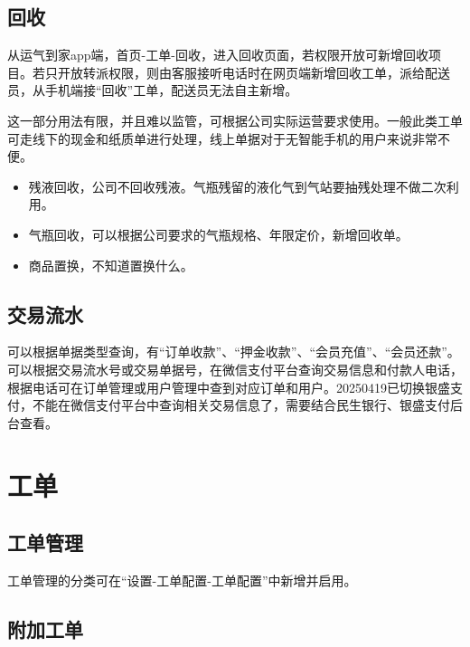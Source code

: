 \documentclass[UTF8]{ctexart}
\begin{document}
\subsection{回收}

从运气到家app端，首页-工单-回收，进入回收页面，若权限开放可新增回收项目。若只开放转派权限，则由客服接听电话时在网页端新增回收工单，派给配送员，从手机端接“回收”工单，配送员无法自主新增。

这一部分用法有限，并且难以监管，可根据公司实际运营要求使用。一般此类工单可走线下的现金和纸质单进行处理，线上单据对于无智能手机的用户来说非常不便。

\begin{itemize}
	
	\item 残液回收，公司不回收残液。气瓶残留的液化气到气站要抽残处理不做二次利用。
	
	\item 气瓶回收，可以根据公司要求的气瓶规格、年限定价，新增回收单。
	
	\item 商品置换，不知道置换什么。
	
\end{itemize}


\subsection{交易流水}

可以根据单据类型查询，有“订单收款”、“押金收款”、“会员充值”、“会员还款”。
可以根据交易流水号或交易单据号，在微信支付平台查询交易信息和付款人电话，根据电话可在订单管理或用户管理中查到对应订单和用户。20250419已切换银盛支付，不能在微信支付平台中查询相关交易信息了，需要结合民生银行、银盛支付后台查看。


\section{工单}

\subsection{工单管理}

工单管理的分类可在“设置-工单配置-工单配置”中新增并启用。

\subsection{附加工单}
\end{document}

